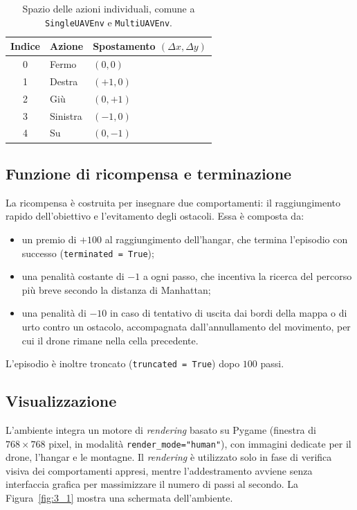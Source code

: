 \documentclass[12pt,a4paper,twoside]{report}
\newcommand{\fonte}[1][elaborazione propria]{\par\vspace{3pt}{\footnotesize\emph{Fonte: #1.}}}
\begin{document}
\begin{table}[htbp]
    \centering
    \begin{tabular}{cll}
        \toprule
        \textbf{Indice} & \textbf{Azione} & \textbf{Spostamento $(\Delta x, \Delta y)$} \\
        \midrule
        0 & Fermo    & $(0, 0)$  \\
        1 & Destra   & $(+1, 0)$ \\
        2 & Giù      & $(0, +1)$ \\
        3 & Sinistra & $(-1, 0)$ \\
        4 & Su       & $(0, -1)$ \\
        \bottomrule
    \end{tabular}
    \caption{Spazio delle azioni individuali, comune a \texttt{SingleUAVEnv} e \texttt{MultiUAVEnv}.}
    \label{tab:3_1}
    \fonte
\end{table}
\newpage
\subsection{Funzione di ricompensa e terminazione}
La ricompensa è costruita per insegnare due comportamenti: il raggiungimento rapido dell'obiettivo e l'evitamento degli ostacoli. Essa è composta da:
\begin{itemize}
    \item un premio di $+100$ al raggiungimento dell'hangar, che termina l'episodio con successo (\texttt{terminated = True});
    \item una penalità costante di $-1$ a ogni passo, che incentiva la ricerca del percorso più breve secondo la distanza di Manhattan;
    \item una penalità di $-10$ in caso di tentativo di uscita dai bordi della mappa o di urto contro un ostacolo, accompagnata dall'annullamento del movimento, per cui il drone rimane nella cella precedente.
\end{itemize}
L'episodio è inoltre troncato (\texttt{truncated = True}) dopo $100$ passi.

\subsection{Visualizzazione}
L'ambiente integra un motore di \emph{rendering} basato su Pygame (finestra di $768 \times 768$ pixel, in modalità \texttt{render\_mode="human"}), con immagini dedicate per il drone, l'hangar e le montagne. Il \emph{rendering} è utilizzato solo in fase di verifica visiva dei comportamenti appresi, mentre l'addestramento avviene senza interfaccia grafica per massimizzare il numero di passi al secondo. La Figura~\ref{fig:3_1} mostra una schermata dell'ambiente.
\end{document}
